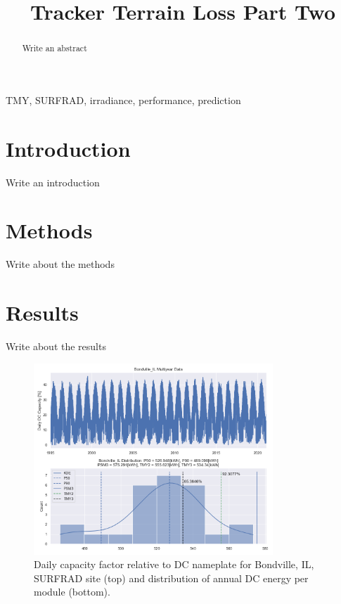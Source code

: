 \documentclass[conference]{IEEEtran}
\begin{document}
\title{Tracker Terrain Loss Part Two}

\author{
	}

\maketitle

\begin{abstract}
Write an abstract
\end{abstract}

\begin{IEEEkeywords}
TMY, SURFRAD, irradiance, performance, prediction
\end{IEEEkeywords}

\section{Introduction}
Write an introduction

\section{Methods}
Write about the methods

\section{Results}
Write about the results

\begin{figure}[htbp]
\centerline{\includegraphics[width=9cm]{Bondville_IL.png}}
\caption{Daily capacity factor relative to DC nameplate for Bondville, IL, SURFRAD site (top) and distribution of annual DC energy per module (bottom).}
\label{fig:Bondville-IL}
\end{figure}
\end{document}
